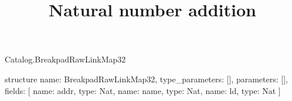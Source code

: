\begin{lexlean}{Catalog.BreakpadRawLinkMap32}
\title{Natural number addition}
\begin{semanticmodule}
structure{
  name: BreakpadRawLinkMap32,
  type_parameters: [],
  parameters: [],
  fields: [
    {name: addr, type: Nat},
    {name: name, type: Nat},
    {name: ld, type: Nat}
  ]
}
\end{semanticmodule}
\end{lexlean}
